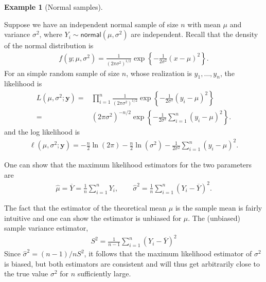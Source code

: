 \documentclass[
  11pt,
  letterpaper,
]{scrbook}
\theoremstyle{definition}
\theoremstyle{definition}
\newtheorem{example}{Example}[chapter]
\theoremstyle{plain}
\theoremstyle{remark}
\begin{document}
\begin{example}[Normal
samples]\protect\hypertarget{exm-normal-mle}{}\label{exm-normal-mle}

Suppose we have an independent normal sample of size \(n\) with mean
\(\mu\) and variance \(\sigma^2\), where
\(Y_i \sim \mathsf{normal}(\mu, \sigma^2)\) are independent. Recall that
the density of the normal distribution is \begin{align*}
f(y; \mu, \sigma^2)=\frac{1}{(2\pi \sigma^2)^{1/2}}\exp\left\{-\frac{1}{2\sigma^2}(x-\mu)^2\right\}.
\end{align*} For an simple random sample of size \(n\), whose
realization is \(y_1, \ldots, y_n\), the likelihood is \begin{align*}
L(\mu, \sigma^2; \boldsymbol{y})=&\prod_{i=1}^n\frac{1}{({2\pi \sigma^2})^{1/2}}\exp\left\{-\frac{1}{2\sigma^2}(y_i-\mu)^2\right\}\\
=&(2\pi \sigma^2)^{-n/2}\exp\left\{-\frac{1}{2\sigma^2}\sum_{i=1}^n(y_i-\mu)^2\right\}.
\end{align*} and the log likelihood is \begin{align*}
\ell(\mu, \sigma^2; \boldsymbol{y})=-\frac{n}{2}\ln(2\pi) -\frac{n}{2}\ln(\sigma^2)-\frac{1}{2\sigma^2}\sum_{i=1}^n (y_i-\mu)^2.
\end{align*}

One can show that the maximum likelihood estimators for the two
parameters are \begin{align*}
\widehat{\mu}=\overline{Y}=\frac{1}{n} \sum_{i=1}^n Y_i, \qquad \widehat{\sigma}^2=\frac{1}{n}\sum_{i=1}^n (Y_i-\overline{Y})^2.
\end{align*}

The fact that the estimator of the theoretical mean \(\mu\) is the
sample mean is fairly intuitive and one can show the estimator is
unbiased for \(\mu\). The (unbiased) sample variance estimator,
\begin{align*}
S^2=\frac{1}{n-1} \sum_{i=1}^n (Y_i-\overline{Y})^2
\end{align*} Since \(\widehat{\sigma}^2=(n-1)/n S^2\), it follows that
the maximum likelihood estimator of \(\sigma^2\) is biased, but both
estimators are consistent and will thus get arbitrarily close to the
true value \(\sigma^2\) for \(n\) sufficiently large.

\end{example}
\end{document}
